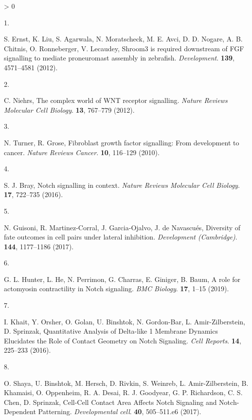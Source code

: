 \documentclass[10pt, b5paper, singlespacinge, twoside]{reedthesis} %
\newlength{\cslhangindent}
\newlength{\csllabelwidth}
\newenvironment{CSLReferences}[3] %
  {%
    \setlength{\parindent}{0pt}
    \ifodd #1 \everypar{\setlength{\hangindent}{\cslhangindent}}\ignorespaces\fi
    \ifnum #2 > 0
    \setlength{\parskip}{#2\baselineskip}
    \fi
  }%
  {}
\newcommand{\CSLLeftMargin}[1]{\parbox[t]{\maxof{\widthof{#1}}{\csllabelwidth}}{#1}}
\newcommand{\CSLRightInline}[1]{\parbox[t]{\linewidth}{#1}}
\theoremstyle{definition}
\theoremstyle{definition}
\theoremstyle{definition}
\theoremstyle{remark}
\begin{document}
\begin{CSLReferences}{0}{0}
\leavevmode\hypertarget{ref-Ernst2012a}{}%
\CSLLeftMargin{1. }
\CSLRightInline{S. Ernst, K. Liu, S. Agarwala, N. Moratscheck, M. E. Avci, D. D. Nogare, A. B. Chitnis, O. Ronneberger, V. Lecaudey, {Shroom3 is required downstream of FGF signalling to mediate proneuromast assembly in zebrafish}. \emph{Development}. \textbf{139}, 4571--4581 (2012).}

\leavevmode\hypertarget{ref-Niehrs2012}{}%
\CSLLeftMargin{2. }
\CSLRightInline{C. Niehrs, {The complex world of WNT receptor signalling}. \emph{Nature Reviews Molecular Cell Biology}. \textbf{13}, 767--779 (2012).}

\leavevmode\hypertarget{ref-Turner2010}{}%
\CSLLeftMargin{3. }
\CSLRightInline{N. Turner, R. Grose, {Fibroblast growth factor signalling: From development to cancer}. \emph{Nature Reviews Cancer}. \textbf{10}, 116--129 (2010).}

\leavevmode\hypertarget{ref-Bray2016}{}%
\CSLLeftMargin{4. }
\CSLRightInline{S. J. Bray, {Notch signalling in context}. \emph{Nature Reviews Molecular Cell Biology}. \textbf{17}, 722--735 (2016).}

\leavevmode\hypertarget{ref-Guisoni2017}{}%
\CSLLeftMargin{5. }
\CSLRightInline{N. Guisoni, R. Martinez-Corral, J. Garcia-Ojalvo, J. de Navascués, {Diversity of fate outcomes in cell pairs under lateral inhibition}. \emph{Development (Cambridge)}. \textbf{144}, 1177--1186 (2017).}

\leavevmode\hypertarget{ref-Hunter2019}{}%
\CSLLeftMargin{6. }
\CSLRightInline{G. L. Hunter, L. He, N. Perrimon, G. Charras, E. Giniger, B. Baum, {A role for actomyosin contractility in Notch signaling}. \emph{BMC Biology}. \textbf{17}, 1--15 (2019).}

\leavevmode\hypertarget{ref-Khait2016}{}%
\CSLLeftMargin{7. }
\CSLRightInline{I. Khait, Y. Orsher, O. Golan, U. Binshtok, N. Gordon-Bar, L. Amir-Zilberstein, D. Sprinzak, {Quantitative Analysis of Delta-like 1 Membrane Dynamics Elucidates the Role of Contact Geometry on Notch Signaling}. \emph{Cell Reports}. \textbf{14}, 225--233 (2016).}

\leavevmode\hypertarget{ref-Shaya2017a}{}%
\CSLLeftMargin{8. }
\CSLRightInline{O. Shaya, U. Binshtok, M. Hersch, D. Rivkin, S. Weinreb, L. Amir-Zilberstein, B. Khamaisi, O. Oppenheim, R. A. Desai, R. J. Goodyear, G. P. Richardson, C. S. Chen, D. Sprinzak, {Cell-Cell Contact Area Affects Notch Signaling and Notch-Dependent Patterning.} \emph{Developmental cell}. \textbf{40}, 505--511.e6 (2017).}


\end{CSLReferences}
\end{document}

